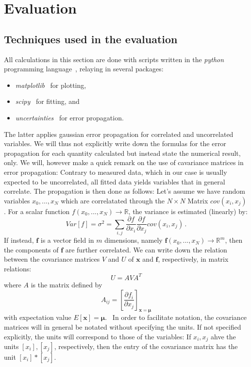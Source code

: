 \newcommand{\figdir}{analysis/figures/}

\section{Evaluation}
\subsection{Techniques used in the evaluation}
All calculations in this section are done with scripts written in 
the \textit{python} programming language~\cite{python}, relaying in several 
packages:
\begin{itemize}
    \item
        \textit{matplotlib}~\cite{Hunter2007} for plotting,
    \item
        \textit{scipy}~\cite{scipy} for fitting, and 
    \item
        \textit{uncertainties}~\cite{uc} for error propagation.
\end{itemize}
The latter applies gaussian error propagation for correlated and uncorrelated variables. 
We will thus not explicitly write down the formulas for the error propagation 
for each quantity calculated but instead state the numerical result, only. 
We will, however make a quick remark on the use of cavariance matrices in 
error propagation: Contrary to measured data, which in our case is usually 
expected to be uncorrelated, all fitted data yields variables that in general correlate. 
The propagation is then done as follows:
Let's assume we have random
variables $x_0,...,x_N$ which are correlatated through the $N\times N$ Matrix $cov(x_i,x_j)$.
For a scalar function $f(x_0,...,x_N) \rightarrow \mathbb{R}$, the variance is estimated (linearly) by:
\begin{equation}
Var[f] = \sigma^2 = \sum_{i,j} \frac{\partial f}{\partial x_i} \frac{\partial f}{\partial x_j} cov(x_i,x_j) \,.
\end{equation} 
If instead, $\mathbf{f}$ is a vector field in $m$ dimensions, namely 
$\mathbf{f}(x_0,...,x_N) \rightarrow \mathbb{R}^m$, then the components of $\mathbf{f}$ 
are further correlated. We can write down the relation between the covariance matrices $V$ and $U$ of 
$\mathbf{x}$ and $\mathbf{f}$, respectively, in matrix relations:
\begin{equation}
    U = A V A^T
\end{equation}
where $A$ is the matrix defined by 
\begin{equation}
    A_{ij} = \left[ \frac{\partial f_i}{\partial x_j}\right]_{\mathbf{x} = \mathbf{\mu}}
\end{equation}
with expectation value $E[\mathbf{x}] = \mathbf{\mu}$.~\cite{cowan1998statistical}
In order to facilitate notation, the covariance matrices will in general be notated without 
specifying the units. If not specified explicitly, the units will correspond to those of the
variables: If $x_i, x_j$ ahve the units $[x_i], [x_j]$, respectively, 
then the entry of the covariance matrix has the unit $[x_i] * [x_j]$. 

